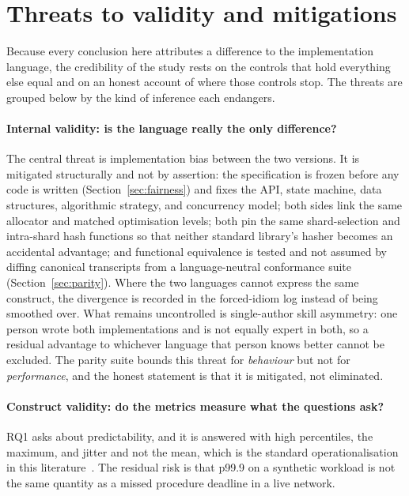 \documentclass[english,twoside,openright,a4paper,censored,csm,software-track-2020]{HYthesisML}
\begin{document}
\section{Threats to validity and mitigations}\label{sec:threats}
Because every conclusion here attributes a difference to the implementation language, the
credibility of the study rests on the controls that hold everything else equal and on an
honest account of where those controls stop. The threats are grouped below by the kind of
inference each endangers.

\paragraph{Internal validity: is the language really the only difference?}
The central threat is implementation bias between the two versions. It is mitigated
structurally and not by assertion: the specification is frozen before any code is written
(Section~\ref{sec:fairness}) and fixes the API, state machine, data structures, algorithmic
strategy, and concurrency model; both sides link the same allocator and matched optimisation
levels; both pin the same shard-selection and intra-shard hash functions so that neither
standard library's hasher becomes an accidental advantage; and functional equivalence is
tested and not assumed by diffing canonical transcripts from a language-neutral
conformance suite (Section~\ref{sec:parity}). Where the two languages cannot express the same
construct, the divergence is recorded in the forced-idiom log instead of being smoothed over.
What remains uncontrolled is single-author skill asymmetry: one person wrote both
implementations and is not equally expert in both, so a residual advantage to whichever
language that person knows better cannot be excluded. The parity suite bounds this threat for
\emph{behaviour} but not for \emph{performance}, and the honest statement is that it is
mitigated, not eliminated.

\paragraph{Construct validity: do the metrics measure what the questions ask?}
RQ1 asks about predictability, and it is answered with high percentiles, the maximum, and jitter
and not the mean, which is the standard operationalisation in this
literature~\cite{dean2013tail}. The residual risk is that p99.9 on a synthetic workload is not
the same quantity as a missed procedure deadline in a live network.
\end{document}
